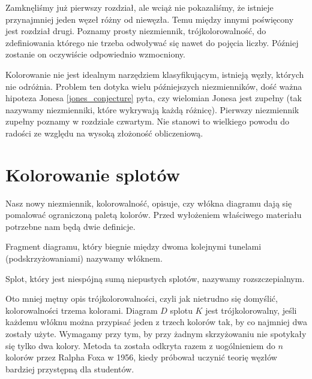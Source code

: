 Zamknęliśmy już pierwszy rozdział, ale wciąż nie pokazaliśmy, że istnieje przynajmniej jeden węzeł różny od niewęzła.
Temu między innymi poświęcony jest rozdział drugi.
Poznamy prosty niezmiennik, trójkolorowalność, do zdefiniowania którego nie trzeba odwoływać się nawet do pojęcia liczby.
Później zostanie on oczywiście odpowiednio wzmocniony.

Kolorowanie nie jest idealnym narzędziem klasyfikującym, istnieją węzły, których nie odróżnia.
Problem ten dotyka wielu późniejszych niezmienników, dość ważna hipoteza Jonesa \ref{jones_conjecture} pyta, czy wielomian Jonesa jest zupełny (tak nazywamy niezmienniki, które wykrywają każdą różnicę).
Pierwszy niezmiennik zupełny poznamy w rozdziale czwartym.
Nie stanowi to wielkiego powodu do radości ze względu na wysoką złożoność obliczeniową.

\section{Kolorowanie splotów} %
\label{sec:colour_links}
Nasz nowy niezmiennik, kolorowalność, opisuje, czy włókna diagramu dają się pomalować ograniczoną paletą kolorów.
Przed wyłożeniem właściwego materiału potrzebne nam będą dwie definicje.

\begin{definition}[włókno] 
	Fragment diagramu, który biegnie między dwoma kolejnymi tunelami (podskrzyżowaniami) nazywamy włóknem.
\end{definition}

\begin{definition}[rozszczepialność]
	Splot, który jest niespójną sumą niepustych splotów, nazywamy rozszczepialnym.
\end{definition}

Oto mniej mętny opis trójkolorowalności, czyli jak nietrudno się domyślić, kolorowalności trzema kolorami.
Diagram $D$ splotu $K$ jest trójkolorowalny, jeśli każdemu włóknu można przypisać jeden z trzech kolorów tak, by co najmniej dwa zostały użyte.
Wymagamy przy tym, by przy żadnym skrzyżowaniu nie spotykały się tylko dwa kolory.
Metoda ta została odkryta razem z uogólnieniem do $n$ kolorów przez Ralpha Foxa w 1956, kiedy próbował uczynić teorię węzłów bardziej przystępną dla studentów.

